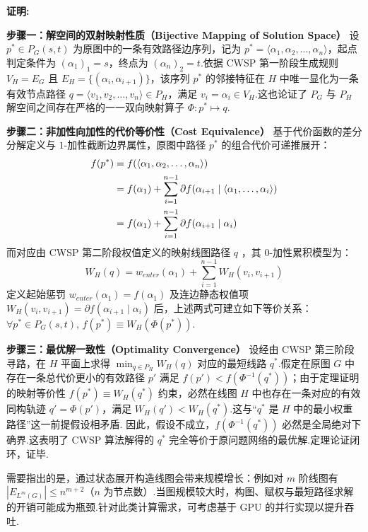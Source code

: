 \textbf{证明:}

\textbf{步骤一：解空间的双射映射性质（Bijective Mapping of Solution Space）}  
设 $p^* \in P_G(s,t)$ 为原图中的一条有效路径边序列，记为 $p^* = \langle \alpha_1, \alpha_2, \dots, \alpha_n \rangle$，起点判定条件为 $(\alpha_1)_1 = s$，终点为 $(\alpha_n)_2 = t$.依据 CWSP 第一阶段生成规则 $V_H = E_G$ 且 $E_H = \{ (\alpha_i, \alpha_{i+1}) \}$，该序列 $p^*$ 的邻接特征在 $H$ 中唯一显化为一条有效节点路径 $q = \langle v_1, v_2, \dots, v_n \rangle \in P_H$，满足 $v_i = \alpha_i \in V_H$.这也论证了 $P_G$ 与 $P_H$ 解空间之间存在严格的一一双向映射算子 $\Phi : p^* \mapsto q$.

\textbf{步骤二：非加性向加性的代价等价性（Cost Equivalence）}  
基于代价函数的差分分解定义与 $1$-加性截断边界属性，原图中路径 $p^*$ 的组合代价可递推展开：
\begin{align}
    f(p^*) &= f(\langle \alpha_1, \alpha_2, \dots, \alpha_n \rangle) \notag \\
           &= f(\alpha_1) + \sum_{i=1}^{n-1} \partial f(\alpha_{i+1} \mid \langle \alpha_1, \dots, \alpha_i \rangle) \notag \\
           &= f(\alpha_1) + \sum_{i=1}^{n-1} \partial f(\alpha_{i+1} \mid \alpha_i)
\end{align}
而对应由 CWSP 第二阶段权值定义的映射线图路径 $q$ ，其 $0$-加性累积模型为：
\begin{equation}
    W_H(q) = w_{enter}(\alpha_1) + \sum_{i=1}^{n-1} W_H(v_i, v_{i+1})
\end{equation}
定义起始惩罚 $w_{enter}(\alpha_1) = f(\alpha_1)$ 及连边静态权值项 $W_H(v_i, v_{i+1}) = \partial f(\alpha_{i+1} \mid \alpha_i)$ 后，上述两式可建立如下等价关系：$\forall p^* \in P_G(s,t), \, f(p^*) \equiv W_H(\Phi(p^*))$.

\textbf{步骤三：最优解一致性（Optimality Convergence）}  
设经由 CWSP 第三阶段寻路，在 $H$ 平面上求得 $\min_{q \in P_H} W_H(q)$ 对应的最短线路 $q^*$.假定在原图 $G$ 中存在一条总代价更小的有效路径 $p'$ 满足 $f(p') < f(\Phi^{-1}(q^*))$；由于定理证明的映射等价性 $f(p^*) \equiv W_H(q^*)$ 约束，必然在线图 $H$ 中也存在一条对应的有效同构轨迹 $q' = \Phi(p')$，满足 $W_H(q') < W_H(q^*)$.这与“$q^*$ 是 $H$ 中的最小权重路径”这一前提假设相矛盾.
因此，假设不成立，$f(\Phi^{-1}(q^*))$ 必然是全局绝对下确界.这表明了 CWSP 算法解得的 $q^*$ 完全等价于原问题网络的最优解.定理论证闭环，证毕.

需要指出的是，通过状态展开构造线图会带来规模增长：例如对 $m$ 阶线图有 $|E_{L^m(G)}| \leq n^{m+2}$（$n$ 为节点数）.当图规模较大时，构图、赋权与最短路径求解的开销可能成为瓶颈.针对此类计算需求，可考虑基于 GPU 的并行实现以提升吞吐.


